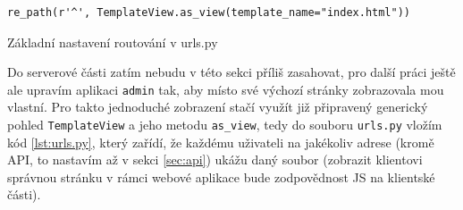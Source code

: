     \begin{listing}[ht]
    	\begin{verbatim}
re_path(r'^', TemplateView.as_view(template_name="index.html"))
    	\end{verbatim}
    	\caption{Základní nastavení routování v urls.py}\label{lst:urls.py}
    \end{listing}
    
    Do serverové části zatím nebudu v této sekci příliš zasahovat, pro další práci ještě ale upravím aplikaci \verb|admin| tak, aby místo své výchozí stránky zobrazovala mou vlastní. Pro takto jednoduché zobrazení stačí využít již připravený generický pohled \verb|TemplateView| a jeho metodu \verb|as_view|, tedy do souboru \verb|urls.py| vložím kód \ref{lst:urls.py}, který zařídí, že každému uživateli na jakékoliv adrese (kromě API, to nastavím až v sekci \ref{sec:api}) ukážu daný soubor (zobrazit klientovi správnou stránku v rámci webové aplikace bude zodpovědnost JS na klientské části).
    
